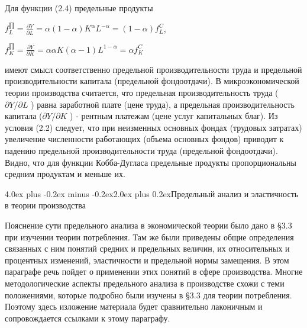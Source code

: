 \documentclass[12pt, 4paper]{book}
\makeatletter
\renewcommand{\section}{\@startsection{section}{1}{1pt}%
	{4.0ex plus -0.2ex minus -0.2ex}{2.0ex plus 0.2ex}{\centering\bf}}%
\makeatother
\begin{document}
{Для функции (2.4) предельные продукты 
\begin{center}
$f_{L}^{\prod}=\frac{\partial Y}{\partial L} = \alpha(1-\alpha)K^{\alpha}L^{- \alpha}=(1-\alpha)f_{L}^{C}$,
\end{center}
\begin{center}
$f_{K}^{\prod}=\frac{\partial Y}{\partial K}=\alpha \alpha K(\alpha -1)L^{1-\alpha} = \alpha f_{K}^{C}$
\end{center}
имеют смысл соответственно предельной производительности труда и предельной производительности капитала (предельной фондоотдачи). В микроэкономической теории производства считается, что предельная производительность труда ( $\partial Y / \partial L$ ) равна заработной плате (цене труда), а предельная производительность капитала ($\partial Y / \partial K$  ) - рентным платежам (цене услуг капитальных благ). Из условия (2.2) следует, что при неизменных основных фондах (трудовых затратах) увеличение численности работающих (объема основных фондов) приводит к падению предельной производительности труда (предельной фондоотдачи). Видно, что для функции Кобба-Дугласа предельные продукты пропорциональны средним продуктам и меньше их.
\newpage
\begin{center}
\section {Предельный анализ и эластичность в теории производства}
\end{center}
\par

Пояснение сути предельного анализа в экономической теории было дано в §3.3 при изучении теории потребления. Там же были приведены общие определения связанных с ним понятий средних и предельных величин, их относительных и процентных изменений, эластичности и предельной нормы замещения. В этом параграфе речь пойдет о применении этих понятий в сфере производства. Многие методологические аспекты предельного анализа в производстве схожи с теми положениями, которые подробно были изучены в §3.3 для теории потребления. Поэтому здесь изложение материала будет сравнительно лаконичным и сопровождается ссылками к этому параграфу. 
\par

}
\end{document}
